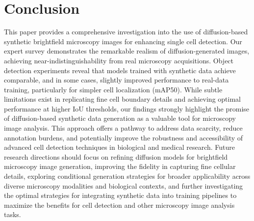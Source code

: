 \section{Conclusion}
\label{sec:conclusion}
This paper provides a comprehensive investigation into the use of diffusion-based synthetic brightfield microscopy images for enhancing single cell detection.
Our expert survey demonstrates the remarkable realism of diffusion-generated images, achieving near-indistinguishability from real microscopy acquisitions.
Object detection experiments reveal that models trained with synthetic data achieve comparable, and in some cases, slightly improved performance to real-data training, particularly for simpler cell localization (mAP\@50).
While subtle limitations exist in  replicating fine cell boundary details and achieving optimal performance at higher IoU thresholds, our findings strongly highlight the promise of diffusion-based synthetic data generation as a valuable tool for microscopy image analysis.
This approach offers a pathway to address data scarcity, reduce annotation burdens, and potentially improve the robustness and accessibility of advanced cell detection techniques in biological and medical research.
Future research directions should focus on refining diffusion models for brightfield microscopy image generation, improving the fidelity in capturing fine cellular details, exploring conditional generation strategies for broader applicability across diverse microscopy modalities and biological contexts, and further investigating the optimal strategies for integrating synthetic data into training pipelines to maximize the benefits for cell detection and other microscopy image analysis tasks.